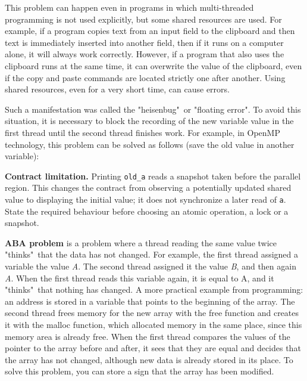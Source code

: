 {	\par This problem can happen even in programs in which multi-threaded programming is not used explicitly, but some shared resources are used. For example, if a program copies text from an input field to the clipboard and then text is immediately inserted into another field, then if it runs on a computer alone, it will always work correctly. However, if a program that also uses the clipboard runs at the same time, it can overwrite the value of the clipboard, even if the copy and paste commands are located strictly one after another. Using shared resources, even for a very short time, can cause errors.
	\par Such a manifestation was called the "heisenbug"\ or "floating error"{}. To avoid this situation, it is necessary to block the recording of the new variable value in the first thread until the second thread finishes work. For example, in OpenMP technology, this problem can be solved as follows (save the old value in another variable):
	\begin{figure}[H]
		
	\end{figure}
	\par\textbf{Contract limitation.} Printing \texttt{old\_a} reads a snapshot taken before the parallel region. This changes the contract from observing a potentially updated shared value to displaying the initial value; it does not synchronize a later read of \texttt{a}. State the required behaviour before choosing an atomic operation, a lock or a snapshot.
	\par\textbf{ABA problem} is a problem where a thread reading the same value twice "thinks"\ that the data has not changed. For example, the first thread assigned a variable the value \textit{A}. The second thread assigned it the value \textit{B}, and then again \textit{A}. When the first thread reads this variable again, it is equal to A, and it "thinks"\ that nothing has changed. A more practical example from programming: an address is stored in a variable that points to the beginning of the array. The second thread frees memory for the new array with the free function and creates it with the malloc function, which allocated memory in the same place, since this memory area is already free. When the first thread compares the values of the pointer to the array before and after, it sees that they are equal and decides that the array has not changed, although new data is already stored in its place. To solve this problem, you can store a sign that the array has been modified.
}
